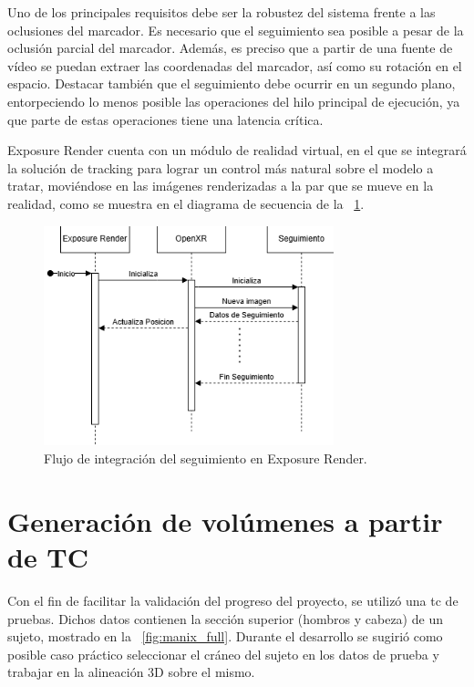 Uno de los principales requisitos debe ser la robustez del sistema frente a las oclusiones del marcador. Es necesario que el seguimiento sea posible a pesar de la oclusión parcial del marcador. Además, es preciso que a partir de una fuente de vídeo se puedan extraer las coordenadas del marcador, así como su rotación en el espacio. Destacar también que el seguimiento debe ocurrir en un segundo plano, entorpeciendo lo menos posible las operaciones del hilo principal de ejecución, ya que parte de estas operaciones tiene una latencia crítica.

Exposure Render cuenta con un módulo de realidad virtual, en el que se integrará la solución de tracking para lograr un control más natural sobre el modelo a tratar, moviéndose en las imágenes renderizadas a la par que se mueve en la realidad, como se muestra en el diagrama de secuencia de la \figurename~\ref{fig:flow_exposure}.

\begin{figure}
	\centering
	\includegraphics[width=0.75\textwidth]{imaxes/flow_exposure.png}
	\caption{Flujo de integración del seguimiento en Exposure Render.}
	\label{fig:flow_exposure}
\end{figure}

\section{Generación de volúmenes a partir de TC}
Con el fin de facilitar la validación del progreso del proyecto, se utilizó una \acrshort{tc} de pruebas. Dichos datos contienen la sección superior (hombros y cabeza) de un sujeto, mostrado en la \figurename~\ref{fig:manix_full}. Durante el desarrollo se sugirió como posible caso práctico seleccionar el cráneo del sujeto en los datos de prueba y trabajar en la alineación 3D sobre el mismo.

